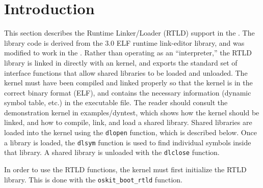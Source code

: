 %
% 
%
\label{rtld}

\section{Introduction}

This section describes the Runtime Linker/Loader (RTLD) support in the
\oskit.  The library code is derived from the \freebsd{} 3.0 ELF runtime
link-editor library, and was modified to work in the \oskit. Rather than
operating as an ``interpreter,'' the RTLD library is linked in directly
with an \oskit{} kernel, and exports the standard set of interface
functions that allow shared libraries to be loaded and unloaded. The
\oskit{} kernel must have been compiled and linked properly so that the
kernel is in the correct binary format (ELF), and contains the necessary
information (dynamic symbol table, etc.) in the executable file. The reader
should consult the demonstration kernel in examples/dyntest, which shows
how the kernel should be linked, and how to compile, link, and load a
shared library.  Shared libraries are loaded into the kernel using the
\texttt{dlopen} function, which is described below.  Once a library is
loaded, the \texttt{dlsym} function is used to find individual symbols
inside that library. A shared library is unloaded with the \texttt{dlclose}
function.

In order to use the RTLD functions, the \oskit{} kernel must first
initialize the RTLD library. This is done with the \texttt{oskit_boot_rtld}
function.

